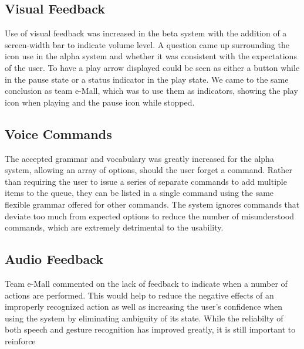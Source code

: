 \documentclass[10pt,letterpaper]{article}
\begin{document}
\subsection*{Visual Feedback}
Use of visual feedback was increased in the beta system with the addition of a screen-width bar to indicate volume level. A question came up surrounding the icon use in the alpha system and whether it was consistent with the expectations of the user. To have a play arrow displayed could be seen as either a button while in the pause state or a status indicator in the play state. We came to the same conclusion as team e-Mall, which was to use them as indicators, showing the play icon when playing and the pause icon while stopped.

\subsection*{Voice Commands}
The accepted grammar and vocabulary was greatly increased for the alpha system, allowing an array of options, should the user forget a command. Rather than requiring the user to issue a series of separate commands to add multiple items to the queue, they can be listed in a single command using the same flexible grammar offered for other commands. The system ignores commands that deviate too much from expected options to reduce the number of misunderstood commands, which are extremely detrimental to the usability.

\subsection*{Audio Feedback}
Team e-Mall commented on the lack of feedback to indicate when a number of actions are performed. This would help to reduce the negative effects of an improperly recognized action as well as increasing the user's confidence when using the system by eliminating ambiguity of its state. While the reliabilty of both speech and gesture recognition has improved greatly, it is still important to reinforce 
\end{document}
